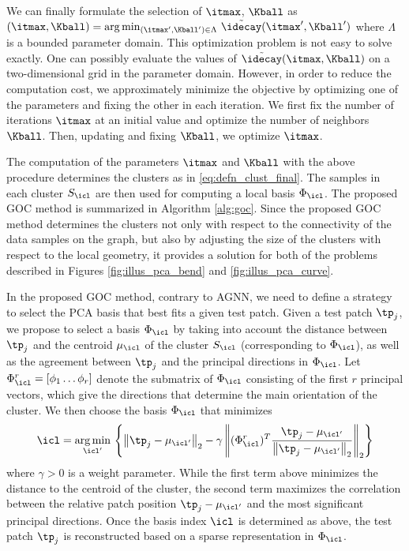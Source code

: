\documentclass[journal]{IEEEtran}
\begin{document}
We can finally formulate the selection of $\itmax$, $\Kball $  as
%
%
$
 (\itmax, \Kball) = \arg\min_{(\itmax', \Kball') \in \Lambda}
  \,\tilde \idecay(\itmax', \Kball')
$
%
where $\Lambda$ is a bounded parameter domain. This optimization problem is not easy to solve exactly. One can possibly evaluate the values of $\tilde \idecay(\itmax, \Kball)$ on a two-dimensional grid in the parameter domain. However, in order to reduce the computation cost, we approximately minimize the objective by optimizing one of the parameters and fixing the other in each iteration. We first fix the number of iterations $\itmax$ at an initial value and optimize the number of neighbors $\Kball$. Then, updating and fixing $\Kball$, we optimize $\itmax$. 

The computation of the parameters $\itmax$ and $\Kball$ with the above procedure determines the clusters as in \eqref{eq:defn_clust_final}. The samples in each cluster $ S_\icl $ are then used for computing a local basis $\Phi_\icl$. The proposed GOC method is summarized in Algorithm \ref{alg:goc}. Since the proposed GOC method determines the clusters not only with respect to the connectivity of the data samples on the graph, but also by adjusting the size of the clusters with respect to the local geometry, it provides a solution for both of the problems described in Figures \ref{fig:illus_pca_bend} and \ref{fig:illus_pca_curve}. 






In the proposed GOC method, contrary to AGNN, we need to define a strategy to select the PCA basis that best fits a given test patch. Given a test patch $\tp_j$, we propose to select a basis $\Phi_\icl$ by taking into account the distance between $\tp_j$ and the centroid $\mu_\icl$ of the cluster $S_\icl$ (corresponding to $\Phi_\icl$), as well as the agreement between $\tp_j$ and the principal directions in $\Phi_\icl$. Let $\Phi_\icl^r = [\phi_1 \dots \phi_r]$ denote the submatrix of $\Phi_\icl$ consisting of the first $r$ principal vectors, which give the directions that determine the main orientation of the cluster. We then choose the basis $\Phi_\icl$ that minimizes 
%
\begin{equation}
	\label{eqn:selectD}
	\icl=\underset{\icl'}{\operatorname{arg\,min}} \, \left\{ \left\| \tp_j -\mu_{\icl'}  \right\|_2-\gamma \left\| (\Phi_\icl^r )^T \frac{ \tp_j-\mu_{\icl'}}{\left\| \tp_j -  \mu_{\icl'} \right\|_2}\right\|_2\right\}
\end{equation}
%
where $\gamma>0$ is a weight parameter. While the first term above minimizes the distance to the centroid of the cluster, the second term maximizes the correlation between the relative patch position $\tp_j-\mu_{\icl'}$  and the most significant principal directions. Once the basis index $\icl$ is determined as above, the test patch $\tp_j$ is reconstructed based on a sparse representation in $\Phi_\icl$.
\end{document}
